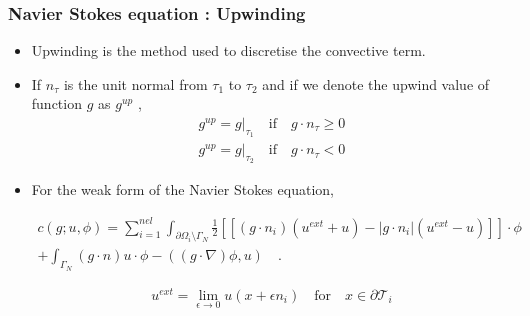 \documentclass{beamer}
\begin{document}
\begin{frame}
\frametitle{Navier Stokes equation : Upwinding}
\begin{itemize}

\item Upwinding is the method used to discretise the convective term. 

\item If $n_\tau$ is the unit normal from $\tau_1$ to $\tau_2$ and if we denote the upwind value of function $g$ as $g^{up}$ \cite{riviere},
\begin{equation}
\begin{split}
g^{up} = g|_{\tau_1} \quad \textrm{if} \quad g \cdot n_\tau \geq 0 \\
g^{up} = g|_{\tau_2} \quad \textrm{if} \quad g \cdot n_\tau < 0
\end{split}
\end{equation}

\item For the weak form of the Navier Stokes equation,

\begin{equation}
\begin{split}
c(g;u,\phi) = \sum_{i=1}^{nel} \int_{\partial \Omega_i \setminus \Gamma_N} \frac{1}{2} [[(g \cdot n_i)(u^{ext} + u) - |g \cdot n_i|(u^{ext} - u)]] \cdot \phi \\ + \int_{\Gamma_N} (g\cdot n) u \cdot \phi -((g\cdot \nabla)\phi,u) \quad \textrm{.}
\end{split}
\end{equation}

\begin{equation} \label{uext}
u^{ext} = \lim_{\epsilon \rightarrow 0} u(x+\epsilon n_i) \quad  \textrm{for} \quad x \in \partial \mathcal{T}_i
\end{equation}

\end{itemize}
\end{frame}

\end{document}
